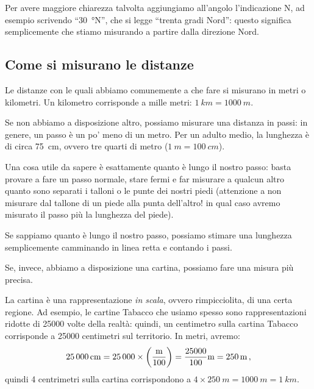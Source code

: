 \documentclass[12pt]{article}
\begin{document}
Per avere maggiore chiarezza talvolta aggiungiamo all'angolo l'indicazione N, ad esempio scrivendo ``\SI{30}{\degree}N'', che si legge ``trenta gradi Nord'': questo significa semplicemente che stiamo misurando a partire dalla direzione Nord. 


\subsection*{Come si misurano le distanze}

Le distanze con le quali abbiamo comunemente a che fare si misurano in metri o kilometri. 
Un kilometro corrisponde a mille metri: \(\SI{1}{km} = \SI{1000}{m}\). 

Se non abbiamo a disposizione altro, possiamo misurare una distanza in passi: in genere, un passo è un po' meno di un metro. Per un adulto medio, la lunghezza è di circa \SI{75}{cm}, ovvero tre quarti di metro (\(\SI{1}{m }  = \SI{100}{cm}\)).

Una cosa utile da sapere è esattamente quanto è lungo il nostro passo: basta provare a fare un passo normale, stare fermi e far misurare a qualcun altro quanto sono separati i talloni o le punte dei nostri piedi (attenzione a non misurare dal tallone di un piede alla punta dell'altro! in qual caso avremo misurato il passo più la lunghezza del piede). 

Se sappiamo quanto è lungo il nostro passo, possiamo stimare una lunghezza semplicemente camminando in linea retta e contando i passi. 

Se, invece, abbiamo a disposizione una cartina, possiamo fare una misura più precisa. 

La cartina è una rappresentazione \emph{in scala}, ovvero rimpicciolita, di una certa regione. Ad esempio, le cartine Tabacco che usiamo spesso sono rappresentazioni ridotte di \num{25000} volte della realtà: quindi, un centimetro sulla cartina Tabacco corrisponde a 25000 centimetri sul territorio. In metri, avremo: 
%
\begin{align}
\SI{25000}{cm} = \num{25000} \times \qty(\frac{\SI{}{m}}{100}) = \frac{25000}{100} \SI{}{m} = \SI{250}{m}
\,,
\end{align}
%
quindi 4 centrimetri sulla cartina corrispondono a \(4 \times \SI{250}{m} = \SI{1000}{m} = \SI{1}{km}\). 
\end{document}
